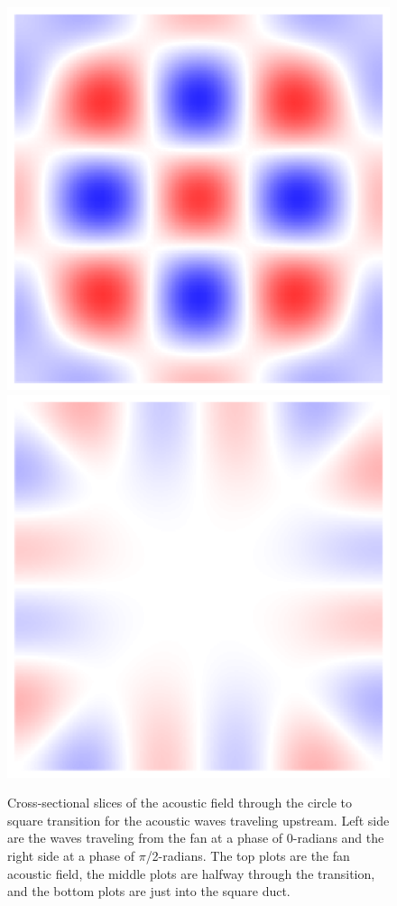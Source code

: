 \begin{figure}
  \includegraphics[trim={0.3in 0.3in 0.3in 0.3in},clip]{../matlab/03_aero_optics_acoustics/tunnel_slices/tunnel_acoustic_against_0.6_8_0_0_012.eps}
  \includegraphics[trim={0.3in 0.3in 0.3in 0.3in},clip]{../matlab/03_aero_optics_acoustics/tunnel_slices/tunnel_acoustic_against_0.6_8_0_1.5708_012.eps}
  \caption{Cross-sectional slices of the acoustic field through the circle to square transition for the acoustic waves traveling upstream. Left side are the waves traveling from the fan at a phase of 0-radians and the right side at a phase of $\pi$/2-radians. The top plots are the fan acoustic field, the middle plots are halfway through the transition, and the bottom plots are just into the square duct.}
  \label{fig:03_transition_acoustics}
\end{figure}
